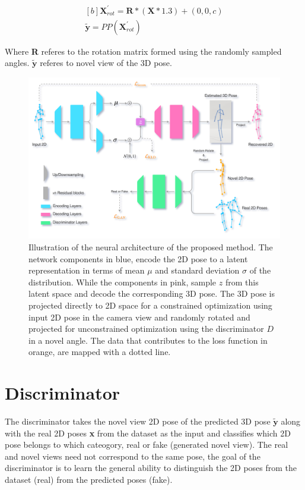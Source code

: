 \begin{equation} \label{eqn:proj_rotated}
    \begin{gathered}[b]
        \textbf{X}^\prime_{rot} = \textbf{R} * (\textbf{X}*1.3) + (0,0,c) \\
        \tilde{\textbf{y}} = PP(\textbf{X}^\prime_{rot})
    \end{gathered}
\end{equation}

Where \textbf{R} referes to the rotation matrix formed using the randomly sampled angles. $\tilde{\textbf{y}}$ referes to novel view of the 3D pose.

\begin{figure}[h] \label{fig:method_arch}
    \centering
    \includegraphics[width=\textwidth]{figures/arch/method_arch.png}
    \caption{Illustration of the neural architecture of the proposed method. The network components in blue, encode the 2D pose to a latent representation in terms of mean $\mu$ and standard deviation $\sigma$ of the distribution. While the components in pink, sample $z$ from this latent space and decode the corresponding 3D pose. The 3D pose is projected directly to 2D space for a constrained optimization using input 2D pose in the camera view and randomly rotated and projected for unconstrained optimization using the discriminator $D$ in a novel angle. The data that contributes to the loss function in orange, are mapped with a dotted line.
    }
\end{figure}

\section{Discriminator}
The discriminator takes the novel view 2D pose of the predicted 3D pose $\tilde{\textbf{y}}$ along with the real 2D poses \textbf{x} from the dataset as the input and classifies which 2D pose belongs to which cateogory, real or fake (generated novel view). The real and novel views need not correspond to the same pose, the goal of the discriminator is to learn the general ability to distinguish the 2D poses from the dataset (real) from the predicted poses (fake).

